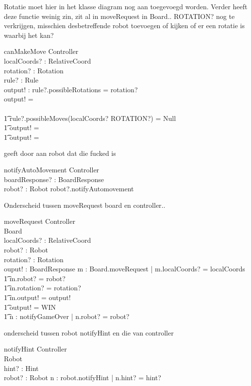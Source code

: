 \documentclass[a4paper,11pt]{article}
\begin{document}
Rotatie moet hier in het klasse diagram nog aan toegevoegd worden. Verder heeft deze functie weinig zin, zit al in moveRequest in Board.. ROTATION? nog te verkrijgen, misschien desbetreffende robot toevoegen of kijken of er een rotatie is waarbij het kan?
\begin{schema}{canMakeMove}
\Xi Controller \\
localCoords? : RelativeCoord \\
rotation? : Rotation \\
rule? : Rule \\
output! : \bool
\where
\IF rule?.possibleRotations = rotation? \\
\THEN output! = \true \\
\ELSE \\ \t1
\IF rule?.possibleMoves(localCoords? \cross ROTATION?) \not = Null \\ \t1
\THEN output! = \true \\ \t1
\ELSE output! = \false
\end{schema}

geeft door aan robot dat die fucked is
\begin{schema}{notifyAutoMovement}
\Xi Controller \\
boardResponse? : BoardResponse \\
robot? : Robot
\where
robot?.notifyAutomovement
\end{schema}

Onderscheid tussen moveRequest board en controller..
\begin{schema}{moveRequest}
\Xi Controller \\
\Delta Board \\
localCoords? : RelativeCoord \\
robot? : Robot \\
rotation? : Rotation \\
ouput! : BoardResponse
\where
\exists m : Board.moveRequest | m.localCoords? = localCoords \\ \t1
m.robot? = robot? \\ \t1
m.rotation? = rotation? \\ \t1
m.output! = output! \\ \t1
\IF output! = WIN \\ \t1
\THEN \exists n : notifyGameOver | n.robot? = robot?
\end{schema}

onderscheid tussen robot notifyHint en die van controller
\begin{schema}{notifyHint}
\Xi Controller \\
\Delta Robot \\
hint? : Hint \\
robot? : Robot
\where
\exists n : robot.notifyHint | n.hint? = hint?
\end{schema}
\end{document}
